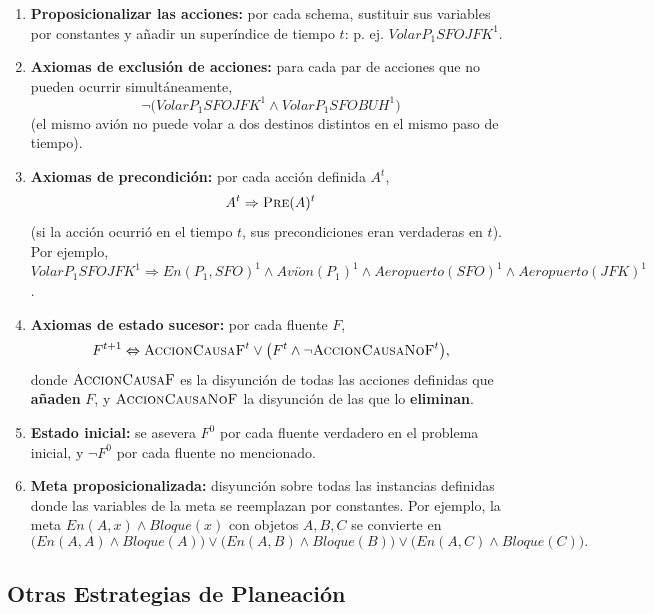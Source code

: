 \begin{enumerate}
    \item \textbf{Proposicionalizar las acciones:} por cada schema, sustituir sus variables por
    constantes y añadir un superíndice de tiempo $t$: p. ej. $VolarP_1SFOJFK^1$.
    \item \textbf{Axiomas de exclusión de acciones:} para cada par de acciones que no pueden ocurrir
    simultáneamente,
    \[
        \neg\big(VolarP_1SFOJFK^1 \land VolarP_1SFOBUH^1\big)
    \]
    (el mismo avión no puede volar a dos destinos distintos en el mismo paso de tiempo).
    \item \textbf{Axiomas de precondición:} por cada acción definida $A^t$,
    \[
        A^t \Rightarrow \textsc{Pre}(A)^t
    \]
    (si la acción ocurrió en el tiempo $t$, sus precondiciones eran verdaderas en $t$). Por ejemplo,
    $VolarP_1SFOJFK^1 \Rightarrow En(P_1,SFO)^1\land Avi\acute{o}n(P_1)^1\land Aeropuerto(SFO)^1\land
    Aeropuerto(JFK)^1$.
    \item \textbf{Axiomas de estado sucesor:} por cada fluente $F$,
    \[
        F^{t+1} \Leftrightarrow \textsc{AccionCausaF}^t \lor \big(F^t \land
        \neg\textsc{AccionCausaNoF}^t\big),
    \]
    donde $\textsc{AccionCausaF}$ es la disyunción de todas las acciones definidas que
    \textbf{añaden} $F$, y $\textsc{AccionCausaNoF}$ la disyunción de las que lo \textbf{eliminan}.
    \item \textbf{Estado inicial:} se asevera $F^0$ por cada fluente verdadero en el problema
    inicial, y $\neg F^0$ por cada fluente no mencionado.
    \item \textbf{Meta proposicionalizada:} disyunción sobre todas las instancias definidas donde las
    variables de la meta se reemplazan por constantes. Por ejemplo, la meta $En(A,x)\land Bloque(x)$
    con objetos $A,B,C$ se convierte en
    \[
        \big(En(A,A)\land Bloque(A)\big) \lor \big(En(A,B)\land Bloque(B)\big) \lor
        \big(En(A,C)\land Bloque(C)\big).
    \]
\end{enumerate}

\subsection{Otras Estrategias de Planeación}

